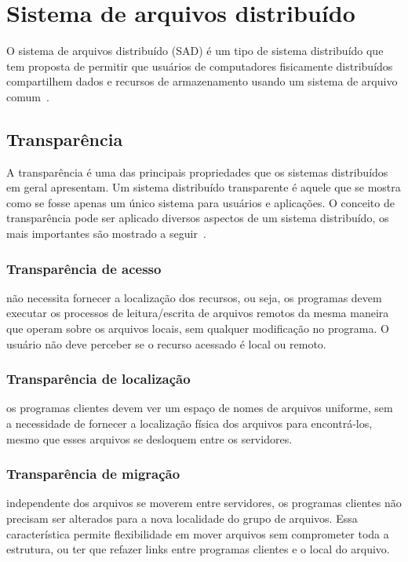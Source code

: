 	\section{Sistema de arquivos distribuído}
	
	O sistema de arquivos distribuído (SAD) é um tipo de sistema distribuído que tem proposta de permitir que usuários de computadores fisicamente distribuídos compartilhem dados e recursos de armazenamento usando um sistema de arquivo comum~\cite{levy90}.
	
	\subsection{Transparência}
	A transparência é uma das principais propriedades que os sistemas distribuídos em geral apresentam. Um sistema distribuído transparente é aquele que se mostra como se fosse apenas um único sistema para usuários e aplicações. O conceito de transparência pode ser aplicado diversos aspectos de um sistema distribuído, os mais importantes são mostrado a seguir~\cite{tanenbaum07}.	

	\subsubsection{Transparência de acesso} não necessita fornecer a localização dos recursos, ou seja, os programas devem executar os processos de leitura/escrita de arquivos remotos da mesma maneira que operam sobre os arquivos locais, sem qualquer modificação no programa. O usuário não deve perceber se o recurso acessado é
	local ou remoto.
	
	\subsubsection{Transparência de localização} os programas clientes devem ver um espaço de nomes de arquivos uniforme, sem a necessidade de fornecer a localização física dos arquivos para encontrá-los, mesmo que esses arquivos se desloquem entre os servidores.
	
	\subsubsection{Transparência de migração} independente dos arquivos se moverem entre servidores, os programas clientes não precisam ser alterados para a nova localidade do grupo de arquivos. Essa característica permite flexibilidade em mover arquivos sem comprometer toda a estrutura, ou ter que refazer links entre programas clientes e o local do arquivo.
	
